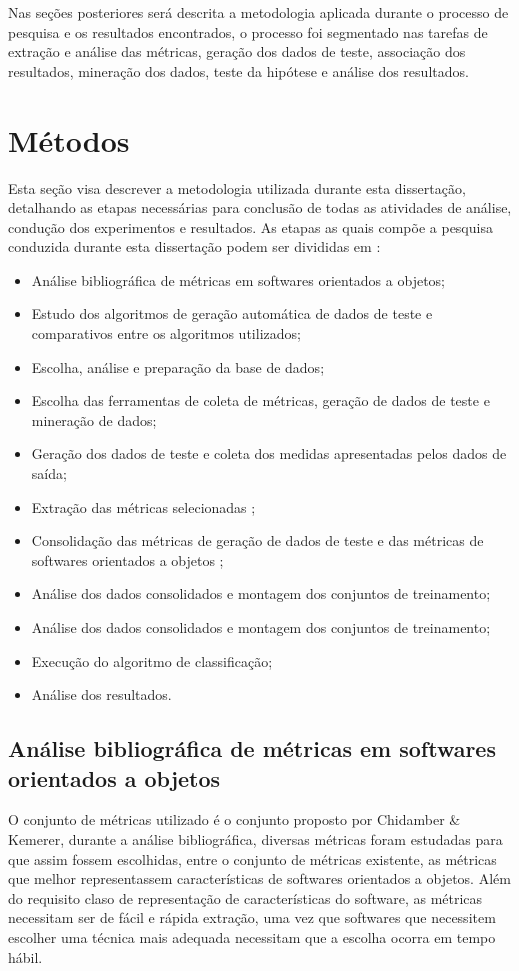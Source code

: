 \documentclass[
	12pt,				%
	oneside,			%
	a4paper,			%
	english,			%
	brazil				%
	]{abntex2ppgsi}
\begin{document}
Nas seções posteriores será descrita a metodologia aplicada durante o processo de pesquisa e os resultados encontrados, o processo foi segmentado nas tarefas de extração e análise das métricas, geração dos dados de teste, associação dos resultados, mineração dos dados, teste da hipótese e análise dos resultados.
 
 \section{Métodos}
 
 Esta seção visa descrever a metodologia utilizada durante esta dissertação, detalhando as etapas necessárias para conclusão de todas as atividades de análise, condução dos experimentos e resultados. As etapas as quais compõe a pesquisa conduzida durante esta dissertação podem ser divididas em :
 
 \begin{itemize}
  \item Análise bibliográfica de métricas em softwares orientados a objetos;
  \item Estudo dos algoritmos de geração automática de dados de teste e comparativos entre os algoritmos utilizados;
  \item Escolha, análise e preparação da base de dados;
  \item Escolha das ferramentas de coleta de métricas, geração de dados de teste e mineração de dados;
  \item Geração dos dados de teste e coleta dos medidas apresentadas pelos dados de saída;
   \item Extração das métricas selecionadas ;
   \item Consolidação das métricas de geração de dados de teste e das métricas de softwares orientados a objetos ;
    \item Análise dos dados consolidados e montagem dos conjuntos de treinamento;
    \item Análise dos dados consolidados e montagem dos conjuntos de treinamento;
    \item Execução do algoritmo de classificação;
    \item Análise dos resultados.
\end{itemize}

\subsection{Análise bibliográfica de métricas em softwares orientados a objetos}
O conjunto de métricas utilizado é o conjunto proposto por Chidamber \& Kemerer, durante a análise bibliográfica, diversas métricas foram estudadas para que assim fossem escolhidas, entre o conjunto de métricas existente, as métricas que melhor representassem características de softwares orientados a objetos. Além do requisito claso de representação de características do software, as métricas necessitam ser de fácil e rápida extração, uma vez que softwares que necessitem escolher uma técnica mais adequada necessitam que a escolha ocorra em tempo hábil. 
\end{document}

